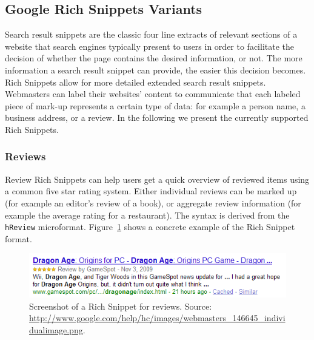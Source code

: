 \documentclass[12pt]{article}
\begin{document}
\subsection{Google Rich Snippets Variants}
Search result snippets are the classic four line extracts of relevant sections of a website that search engines typically present to users in order to facilitate the decision of whether the page contains the desired information, or not. The more information a search result snippet can provide, the easier this decision becomes. Rich Snippets allow for more detailed extended search result snippets. Webmasters can label their websites' content to communicate that each labeled piece of mark-up represents a certain type of data: for example a person name, a business address, or a review. In the following we present the currently supported Rich Snippets.

\subsubsection{Reviews}
Review Rich Snippets can help users get a quick overview of reviewed items using a common five star rating system. Either individual reviews can be marked up (for example an editor's review of a book), or aggregate review information (for example the average rating for a restaurant). The syntax is derived from the \texttt{hReview} microformat. Figure~\ref{fig:rich-snippets-reviews} shows a concrete example of the Rich Snippet format.
\begin{figure}[htbp!]
\begin{center}
  \includegraphics[width=0.75\linewidth]{./resources/rich-snippets-reviews.png}  
  \caption[Screenshot of a Rich Snippet for reviews.]{Screenshot of a Rich Snippet for reviews. Source: \url{http://www.google.com/help/hc/images/webmasters_146645_individualimage.png}.}
  \label{fig:rich-snippets-reviews}
  \end{center}  
\end{figure}
\end{document}

